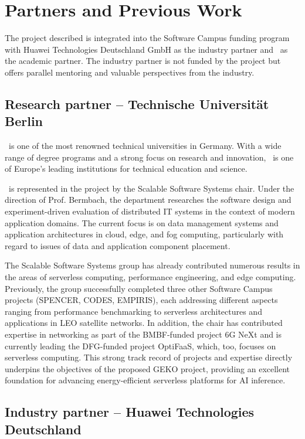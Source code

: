 \clearpage
\section{Partners and Previous Work}
\label{sec:partner}

The project described is integrated into the Software Campus funding program with Huawei Technologies Deutschland GmbH as the industry partner and \TU\ as the academic partner.
The industry partner is not funded by the project but offers parallel mentoring and valuable perspectives from the industry.

\subsection{Research partner -- Technische Universität Berlin}
\label{sec:partner:tub}

\TU\ is one of the most renowned technical universities in Germany.
With a wide range of degree programs and a strong focus on research and innovation, \TU\ is one of Europe's leading institutions for technical education and science.

\TU\ is represented in the project by the Scalable Software Systems chair.
Under the direction of Prof. Bermbach, the department researches the software design and experiment-driven evaluation of distributed IT systems in the context of modern application domains.
The current focus is on data management systems and application architectures in cloud, edge, and fog computing, particularly with regard to issues of data and application component placement.

The Scalable Software Systems group has already contributed numerous results in the areas of serverless computing, performance engineering, and edge computing.
Previously, the group successfully completed three other Software Campus projects (SPENCER, CODES, EMPIRIS), each addressing different aspects ranging from performance benchmarking to serverless architectures and applications in LEO satellite networks.
In addition, the chair has contributed expertise in networking as part of the BMBF-funded project 6G NeXt and is currently leading the DFG-funded project OptiFaaS, which, too, focuses on serverless computing.
This strong track record of projects and expertise directly underpins the objectives of the proposed GEKO project, providing an excellent foundation for advancing energy-efficient serverless platforms for AI inference.

\subsection{Industry partner -- Huawei Technologies Deutschland}
\label{sec:partner:industrie}

